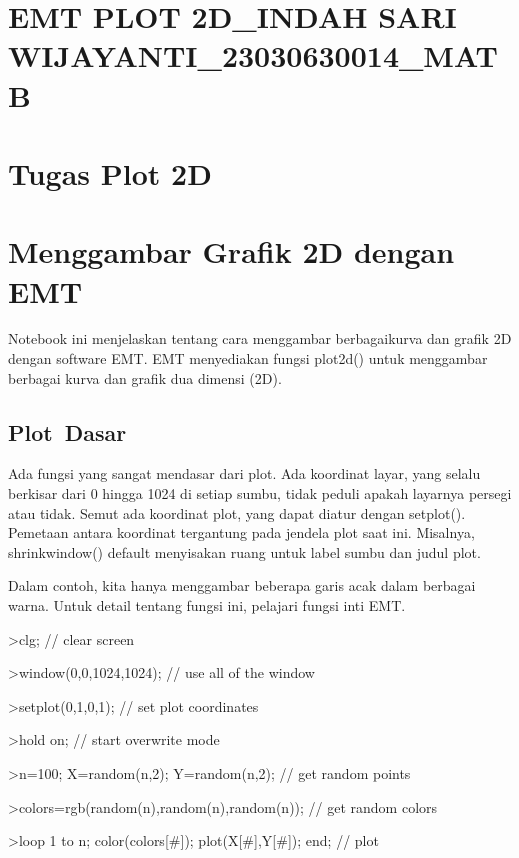\documentclass[
]{book}
\author{}
\date{}
\begin{document}
\frontmatter

\mainmatter
\chapter{EMT PLOT 2D\_INDAH SARI WIJAYANTI\_23030630014\_MAT B}\label{emt-plot-2d_indah-sari-wijayanti_23030630014_mat-b}

\chapter{Tugas Plot 2D}\label{tugas-plot-2d}

\chapter{Menggambar Grafik 2D dengan EMT}\label{menggambar-grafik-2d-dengan-emt}

Notebook ini menjelaskan tentang cara menggambar berbagaikurva dan grafik 2D dengan software EMT. EMT menyediakan fungsi plot2d() untuk menggambar berbagai kurva dan grafik dua dimensi (2D).

\section{Plot~Dasar}\label{plot-dasar}

Ada fungsi yang sangat mendasar dari plot. Ada koordinat layar, yang selalu berkisar dari 0 hingga 1024 di setiap sumbu, tidak peduli apakah layarnya persegi atau tidak. Semut ada koordinat plot, yang dapat diatur dengan setplot(). Pemetaan antara koordinat tergantung pada jendela plot saat ini. Misalnya, shrinkwindow() default menyisakan ruang untuk label sumbu dan judul plot.

Dalam contoh, kita hanya menggambar beberapa garis acak dalam berbagai warna. Untuk detail tentang fungsi ini, pelajari fungsi inti EMT.

\textgreater clg; // clear screen

\textgreater window(0,0,1024,1024); // use all of the window

\textgreater setplot(0,1,0,1); // set plot coordinates

\textgreater hold on; // start overwrite mode

\textgreater n=100; X=random(n,2); Y=random(n,2); // get random points

\textgreater colors=rgb(random(n),random(n),random(n)); // get random colors

\textgreater loop 1 to n; color(colors{[}\#{]}); plot(X{[}\#{]},Y{[}\#{]}); end; // plot
\end{document}
